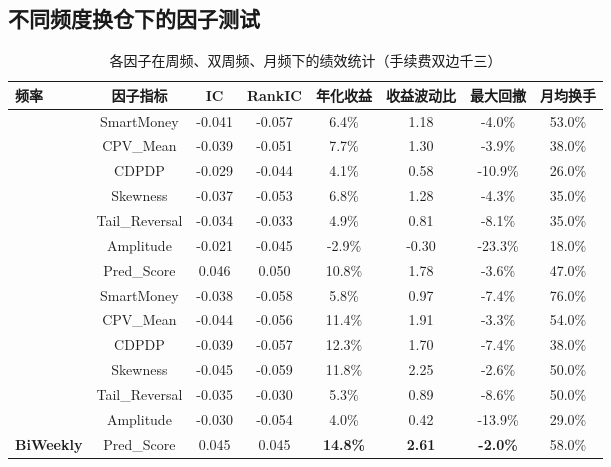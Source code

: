 \documentclass[10pt,compsoc,UTF8]{CjC}
\begin{document}
\subsection{不同频度换仓下的因子测试}
\begin{table}[!h]
\centering
\caption{各因子在周频、双周频、月频下的绩效统计（手续费双边千三）}
\begin{tabular}{|l|c|cccccc|}
\hline
\rowcolor{headerblue} 
\textcolor{textwhite}{\textbf{频率}} & \textcolor{textwhite}{\textbf{因子指标}} & \textcolor{textwhite}{\textbf{IC}} & \textcolor{textwhite}{\textbf{RankIC}} & \textcolor{textwhite}{\textbf{年化收益}} & \textcolor{textwhite}{\textbf{收益波动比}} & \textcolor{textwhite}{\textbf{最大回撤}} & \textcolor{textwhite}{\textbf{月均换手}} \\ \hline

\rowcolor{rowgray}
& SmartMoney & -0.041 & -0.057 & 6.4\% & 1.18 & -4.0\% & 53.0\% \\ 
\rowcolor{rowgray}
& CPV\_Mean & -0.039 & -0.051 & 7.7\% & 1.30 & -3.9\% & 38.0\% \\ 
\rowcolor{rowgray}
& CDPDP & -0.029 & -0.044 & 4.1\% & 0.58 & -10.9\% & 26.0\% \\ 
\rowcolor{rowgray}
& Skewness & -0.037 & -0.053 & 6.8\% & 1.28 & -4.3\% & 35.0\% \\ 
\rowcolor{rowgray}
& Tail\_Reversal & -0.034 & -0.033 & 4.9\% & 0.81 & -8.1\% & 35.0\% \\ 
\rowcolor{rowgray}
& Amplitude & -0.021 & -0.045 & -2.9\% & -0.30 & -23.3\% & 18.0\% \\ 
\rowcolor{rowgray}
\multirow{-7}{*}{\textbf{Weekly}} & Pred\_Score & 0.046 & 0.050 & 10.8\% & 1.78 & -3.6\% & 47.0\% \\ \hline

& SmartMoney & -0.038 & -0.058 & 5.8\% & 0.97 & -7.4\% & 76.0\% \\ 
& CPV\_Mean & -0.044 & -0.056 & 11.4\% & 1.91 & -3.3\% & 54.0\% \\ 
& CDPDP & -0.039 & -0.057 & 12.3\% & 1.70 & -7.4\% & 38.0\% \\ 
& Skewness & -0.045 & -0.059 & 11.8\% & 2.25 & -2.6\% & 50.0\% \\ 
& Tail\_Reversal & -0.035 & -0.030 & 5.3\% & 0.89 & -8.6\% & 50.0\% \\ 
& Amplitude & -0.030 & -0.054 & 4.0\% & 0.42 & -13.9\% & 29.0\% \\ 
\multirow{-7}{*}{\textbf{BiWeekly}} & Pred\_Score & 0.045 & 0.045 & \textbf{14.8\%} & \textbf{2.61} & \textbf{-2.0\%} & 58.0\% \\ \hline


\end{tabular}
\end{table}
\end{document}

